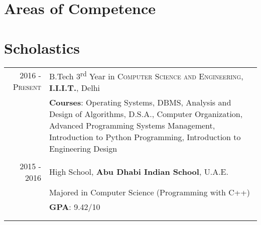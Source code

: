 \documentclass[a4paper,10pt]{article}
\begin{document}
\section{Areas of Competence}
\begin{Parallel}{0.45\textwidth}{0.53\textwidth}
\ParallelPar
\end{Parallel}

\section{Scholastics}
\begin{tabular}{r|p{13.6cm}}
 \textsc{2016 - Present} & B.Tech 3\textsuperscript{rd} Year in \textsc{Computer Science and Engineering}, \textbf{I.I.I.T.}, Delhi\\
& \textbf{Courses}: Operating Systems, DBMS, Analysis and Design of Algorithms, D.S.A., Computer Organization, Advanced Programming
    Systems Management, Introduction to Python Programming, Introduction to Engineering Design\\\multicolumn{1}{c}{}\\
\textsc{2015 - 2016}& High School, \normalsize\textbf{Abu Dhabi Indian School}, U.A.E.\\
& Majored in Computer Science (Programming with C++) \\
&\normalsize \textbf{GPA}: 9.42/10\\&\\\multicolumn{1}{c}{}\\
\end{tabular}

\end{document}
